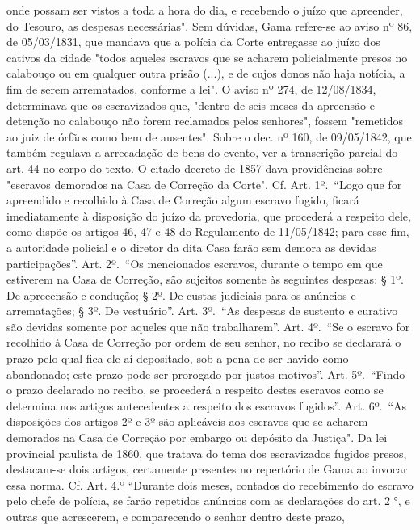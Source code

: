 {  onde possam ser vistos a toda a hora do dia, e recebendo o juízo que
  apreender, do Tesouro, as despesas necessárias". Sem dúvidas, Gama
  refere-se ao aviso nº 86, de 05/03/1831, que mandava que a polícia da
  Corte entregasse ao juízo dos cativos da cidade "todos aqueles
  escravos que se acharem policialmente presos no calabouço ou em
  qualquer outra prisão (...), e de cujos donos não haja notícia, a fim
  de serem arrematados, conforme a lei". O aviso nº 274, de 12/08/1834,
  determinava que os escravizados que, "dentro de seis meses da
  apreensão e detenção no calabouço não forem reclamados pelos
  senhores", fossem "remetidos ao juiz de órfãos como bem de ausentes".
  Sobre o dec. nº 160, de 09/05/1842, que também regulava a arrecadação
  de bens do evento, ver a transcrição parcial do art. 44 no corpo do
  texto. O citado decreto de 1857 dava providências sobre "escravos
  demorados na Casa de Correção da Corte". Cf. Art. 1º.~``Logo que for
  apreendido e recolhido à Casa de Correção algum escravo fugido, ficará
  imediatamente à disposição do juízo da provedoria, que procederá a
  respeito dele, como dispõe os artigos 46, 47 e 48 do Regulamento de
  11/05/1842; para esse fim, a autoridade policial e o diretor da dita
  Casa farão sem demora as devidas participações''. Art. 2º.~``Os
  mencionados escravos, durante o tempo em que estiverem na Casa de
  Correção, são sujeitos somente às seguintes despesas: § 1º. De
  apreeensão e condução; § 2º. De custas judiciais para os anúncios e
  arrematações; § 3º. De vestuário''. Art. 3º.~``As despesas de sustento
  e curativo são devidas somente por aqueles que não trabalharem''. Art.
  4º.~``Se o escravo for recolhido à Casa de Correção por ordem de seu
  senhor, no recibo se declarará o prazo pelo qual fica ele aí
  depositado, sob a pena de ser havido como abandonado; este prazo pode
  ser prorogado por justos motivos''. Art. 5º.~``Findo o prazo declarado
  no recibo, se procederá a respeito destes escravos como se determina
  nos artigos antecedentes a respeito dos escravos fugidos''. Art.
  6º.~``As disposições dos artigos 2º e 3º são aplicáveis aos escravos
  que se acharem demorados na Casa de Correção por embargo ou depósito
  da Justiça". Da lei provincial paulista de 1860, que tratava do tema
  dos escravizados fugidos presos, destacam-se dois artigos, certamente
  presentes no repertório de Gama ao invocar essa norma. Cf. Art. 4.º
  ``Durante dois meses, contados do recebimento do escravo pelo chefe de
  polícia, se farão repetidos anúncios com as declarações do art. 2 °, e
  outras que acrescerem, e comparecendo o senhor dentro deste prazo,
}
